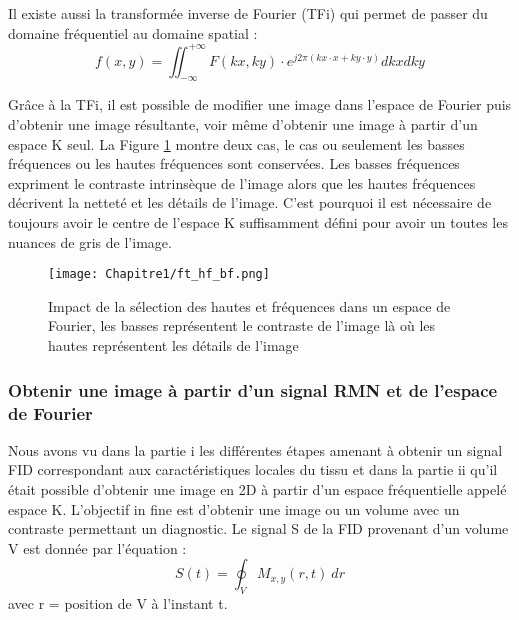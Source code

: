 Il existe aussi la transformée inverse de Fourier (TFi) qui permet de passer du domaine fréquentiel au domaine spatial :
\begin{equation}
\nonumber
f(x,y)=\iint_{-\infty}^{+\infty}{F\left(kx,ky\right)\cdot e^{j2\pi(kx\cdot x+ky\cdot y)}dkxdky}
\end{equation}

Grâce à la TFi, il est possible de modifier une image dans l’espace de Fourier puis d’obtenir une image résultante, voir même d’obtenir une image à partir d’un espace K seul. La Figure \ref{fig:ft_HF_BF} montre deux cas, le cas ou seulement les basses fréquences ou les hautes fréquences sont conservées. Les basses fréquences expriment le contraste intrinsèque de l’image alors que les hautes fréquences décrivent la netteté et les détails de l’image. C’est pourquoi il est nécessaire de toujours avoir le centre de l’espace K suffisamment défini pour avoir un toutes les nuances de gris de l’image.

\begin{figure}[!htbp]
  \begin{center}
    \texttt{[image: Chapitre1/ft\_hf\_bf.png]}
     \end{center}
    \caption{Impact de la sélection des hautes et fréquences dans un espace de Fourier, les basses représentent le contraste de l’image là où les hautes représentent les détails de l’image}
  \label{fig:ft_HF_BF}
\end{figure}

	\subsubsection{Obtenir une image à partir d’un signal RMN et de l’espace de Fourier}

Nous avons vu dans la partie i les différentes étapes amenant à obtenir un signal FID correspondant aux caractéristiques locales du tissu et dans la partie ii qu’il était possible d’obtenir une image en 2D à partir d’un espace fréquentielle appelé espace K. L’objectif in fine est d’obtenir une image ou un volume avec un contraste permettant un diagnostic.
Le signal S de la FID provenant d’un volume V est donnée par l’équation :
\begin{equation}
\nonumber
S\left(t\right)=\oint_{V}{M_{x,y}\left(r,t\right)\ dr}
\end{equation}
avec r = position de V à l’instant t.

